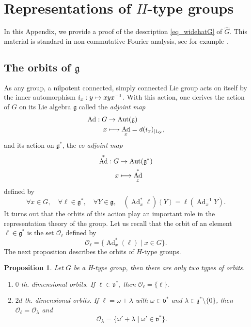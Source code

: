 \documentclass[10pt]{amsart}
\let\mathcal\mathscr
\newcommand\mto{\mathchoice{\longmapsto}{\mapsto}{\mapsto}{\mapsto}}
\let\sep\mid
\DeclareMathOperator{\Ad}{Ad}
\DeclareMathOperator{\Aut}{Aut}
\theoremstyle{plain}
\newtheorem{proposition}[theorem]{Proposition}
\theoremstyle{definition}
\begin{document}
\appendix

\section{Representations of \texorpdfstring{$H$}{H}-type groups} \label{a:rep}
In this Appendix, we provide a proof of the description \eqref{eq_widehatG} of $\widehat{G}$. This material is standard in non-commutative Fourier analysis, see for example \cite{CG}.

\subsection{The orbits of $\mathfrak g$}
As any group, a nilpotent connected, simply connected Lie group acts on itself by the inner automorphism $i_x: y\mto xyx^{-1}$. With this action, one derives the action of
$G$ on its Lie algebra $\mathfrak g$ called the \emph{adjoint map}
\begin{align*}
\Ad : G &\to \Aut (\mathfrak g)\\
x & \mto \Ad_x= d(i_x)_{| 1_G},
\end{align*}
and its action on $\mathfrak g^*$, the \emph{co-adjoint map}
\begin{align*}
\Ad^* : G &\to \Aut (\mathfrak g^*)\\
x & \mto \Ad^*_x
\end{align*}
defined by
\[
\forall x\in G, \quad \forall \ell \in \mathfrak g^*,\quad \forall Y\in \mathfrak g,\quad (\Ad^*_x \ell)(Y)=\ell(\Ad_x^{-1} Y).
\]
It turns out that the orbits of this action play an important role in the representation theory of the group.
Let us recall that the orbit of an element $\ell \in \mathfrak g^*$ is the set $\mathcal O_\ell$ defined by
\[
\mathcal O_\ell = \{ \Ad^*_x(\ell)\sep x\in G\}.
\]
The next proposition describes the orbits of $H$-type groups.

\begin{proposition}
Let $G$ be a H-type group, then there are only two types of orbits.
\begin{enumerate}
\item[(i)] $0$-th. dimensional orbits. If $\ell \in \mathfrak v^*$, then $\mathcal O_\ell = \{\ell\}$.
\item [(ii)] $2d$-th. dimensional orbits. If $\ell = \omega +\lambda$ with $\omega\in \mathfrak v^*$ and $\lambda\in\mathfrak z^*\setminus\{0\}$, then $\mathcal O_\ell =\mathcal O_\lambda$ and
\[
\mathcal O_\lambda = \{ \omega' + \lambda\sep \omega'\in \mathfrak v^*\}.
\]
\end{enumerate}
\end{proposition}
\end{document}
